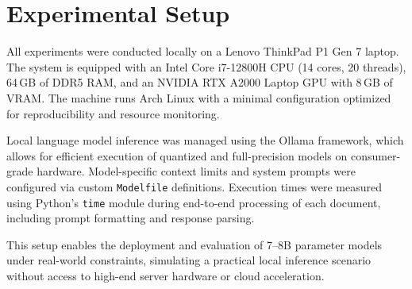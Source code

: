 \section{Experimental Setup}

All experiments were conducted locally on a Lenovo ThinkPad P1 Gen 7 laptop. The system is equipped with an Intel Core i7-12800H CPU (14 cores, 20 threads), 64\,GB of DDR5 RAM, and an NVIDIA RTX A2000 Laptop GPU with 8\,GB of VRAM. The machine runs Arch Linux with a minimal configuration optimized for reproducibility and resource monitoring.

Local language model inference was managed using the Ollama framework, which allows for efficient execution of quantized and full-precision models on consumer-grade hardware. Model-specific context limits and system prompts were configured via custom \texttt{Modelfile} definitions. Execution times were measured using Python’s \texttt{time} module during end-to-end processing of each document, including prompt formatting and response parsing.

This setup enables the deployment and evaluation of 7--8B parameter models under real-world constraints, simulating a practical local inference scenario without access to high-end server hardware or cloud acceleration.

